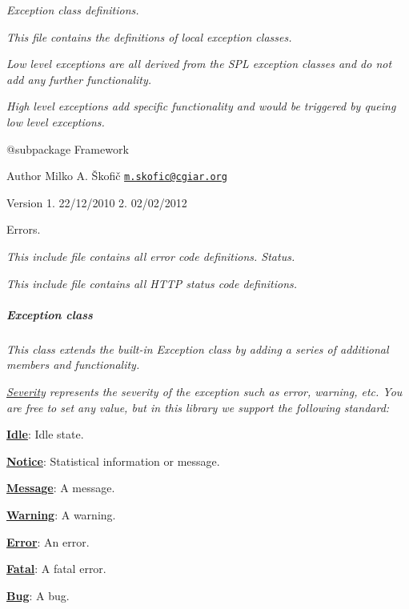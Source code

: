 {\itshape Exception class definitions.}

{\itshape This file contains the definitions of local exception classes.}

{\itshape Low level exceptions are all derived from the S\-P\-L exception classes and do not add any further functionality.}

{\itshape High level exceptions add specific functionality and would be triggered by queing low level exceptions.}

{\itshape \begin{DoxyVerb} @subpackage        Framework
\end{DoxyVerb}
}

{\itshape \begin{DoxyAuthor}{Author}
Milko A. Škofič \href{mailto:m.skofic@cgiar.org}{\tt m.\-skofic@cgiar.\-org} 
\end{DoxyAuthor}
\begin{DoxyVersion}{Version}
1. 22/12/2010 2. 02/02/2012
\end{DoxyVersion}
Errors.}

{\itshape This include file contains all error code definitions. Status.}

{\itshape This include file contains all H\-T\-T\-P status code definitions. \subparagraph*{Exception class}}

{\itshape }

{\itshape This class extends the built-\/in {\itshape Exception} class by adding a series of additional members and functionality.}

{\itshape \hyperlink{}{Severity} represents the severity of the exception such as {\itshape error}, {\itshape warning}, etc. You are free to set any value, but in this library we support the following standard\-: 
\begin{DoxyItemize}
\item {\bfseries \hyperlink{}{Idle}}\-: Idle state. 
\item {\bfseries \hyperlink{}{Notice}}\-: Statistical information or message. 
\item {\bfseries \hyperlink{}{Message}}\-: A message. 
\item {\bfseries \hyperlink{}{Warning}}\-: A warning. 
\item {\bfseries \hyperlink{}{Error}}\-: An error. 
\item {\bfseries \hyperlink{}{Fatal}}\-: A fatal error. 
\item {\bfseries \hyperlink{}{Bug}}\-: A bug. 
\end{DoxyItemize}}

